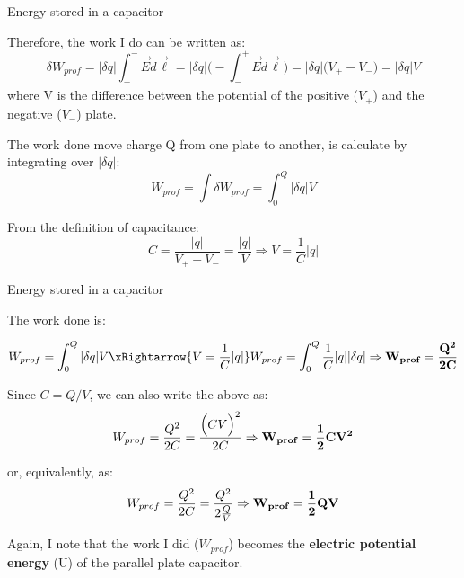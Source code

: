 \begin{frame}{Energy stored in a capacitor}

Therefore, the work I do can be written as:
\begin{equation*}
  {\delta}W_{prof} =
    |{\delta}q| \int_{+}^{-} \vec{E} d\vec{\ell} =
    |{\delta}q| \Big( - \int_{-}^{+} \vec{E} d\vec{\ell} \Big) =
    |{\delta}q| \Big(V_{+} - V_{-} \Big) =
    |{\delta}q| V
\end{equation*}
where V is the difference between the potential of the positive ($V_{+}$) and the negative ($V_{-}$) plate.

The work done move charge Q from one plate to another, is calculate by integrating over $|{\delta}q|$:
\begin{equation*}
  W_{prof} =
     \int {\delta}W_{prof} =
     \int_{0}^{Q}  |{\delta}q| V
\end{equation*}

From the definition of capacitance:
\begin{equation*}
  C = \frac{|q|}{V_{+} - V_{-}} = \frac{|q|}{V} \Rightarrow V = \frac{1}{C} |q|
\end{equation*}

\end{frame}

%
%
%

\begin{frame}{Energy stored in a capacitor}

The work done is:

\begin{equation*}
  W_{prof} = \int_{0}^{Q}  |{\delta}q| V \xRightarrow{V = \frac{1}{C} |q|}
  W_{prof} = \int_{0}^{Q}  \frac{1}{C} |q| |{\delta}q| \Rightarrow
  {\bf W_{prof} = \frac{Q^2}{2C} }
\end{equation*}

Since $C=Q/V$, we can also write the above as:
\begin{equation*}
  W_{prof} = \frac{Q^2}{2C} = \frac{\Big( C V \Big)^2 }{2C} \Rightarrow
  {\bf W_{prof} = \frac{1}{2} C V^2}
\end{equation*}

or, equivalently, as:
\begin{equation*}
  W_{prof} = \frac{Q^2}{2C} = \frac{Q^2}{2\frac{Q}{V}} \Rightarrow
  {\bf W_{prof} = \frac{1}{2} Q V}
\end{equation*}

Again, I note that the work I did ($W_{prof}$) becomes
the {\bf electric potential energy} (U) of the parallel plate capacitor.

\end{frame}

